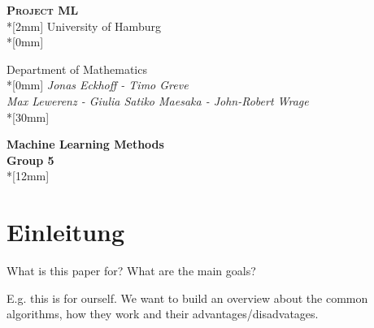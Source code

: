 \documentclass[a4paper,titlepage]{article}
\numberwithin{equation}{section} %
\begin{document}
\begin{titlepage}
\begin{center}                     
        {\Large\scshape \textbf{Project ML}}\\*[2mm]
				{\large University of Hamburg}\\*[0mm]

				{\large Department of Mathematics}\\*[0mm]
				{\large \emph{Jonas Eckhoff - Timo Greve\\ 
Max Lewerenz - Giulia Satiko Maesaka - John-Robert Wrage}}\\*[30mm]
				

        {\bf \LARGE Machine Learning Methods
         \\ Group 5}\\*[12mm]

\end{center}  

\end{titlepage}
\newpage


\setcounter{page}{2}

\tableofcontents
\newpage

\listoffigures
\newpage

\newpage


\setcounter{page}{1}
\section{Einleitung}

What is this paper for?
What are the main goals?

E.g.
this is for ourself. We want to build an overview about the common algorithms, how they work and their advantages/disadvatages.

\newpage

\end{document}
